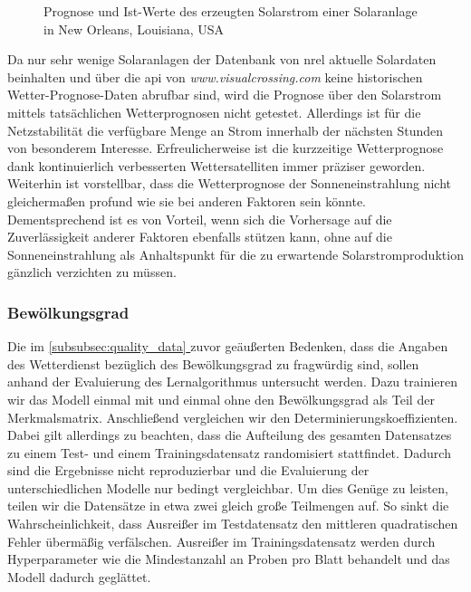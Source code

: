\documentclass[12pt, a4paper]{article}
\newcommand*{\fullref}[1]{\hyperref[{#1}]{\autoref*{#1} \nameref*{#1}}}
\begin{document}
\begin{figure}
\centering
\def\svgwidth{400pt}

\caption{Prognose und Ist-Werte des erzeugten Solarstrom einer Solaranlage in New Orleans, Louisiana, USA}
\label{fig:predictions_1244}
\end {figure}

Da nur sehr wenige Solaranlagen der Datenbank von \ac{nrel} aktuelle Solardaten beinhalten und über die \ac{api} von \textit{www.visualcrossing.com} keine historischen Wetter-Prognose-Daten abrufbar sind, wird die Prognose über den Solarstrom mittels tatsächlichen Wetterprognosen nicht getestet. Allerdings ist für die Netzstabilität die verfügbare Menge an Strom innerhalb der nächsten Stunden von besonderem Interesse. Erfreulicherweise ist die kurzzeitige Wetterprognose dank kontinuierlich verbesserten Wettersatelliten immer präziser geworden. Weiterhin ist vorstellbar, dass die Wetterprognose der Sonneneinstrahlung nicht gleichermaßen profund wie sie bei anderen Faktoren sein könnte. Dementsprechend ist es von Vorteil, wenn sich die Vorhersage auf die Zuverlässigkeit anderer Faktoren ebenfalls stützen kann, ohne auf die Sonneneinstrahlung als Anhaltspunkt für die zu erwartende Solarstromproduktion gänzlich verzichten zu müssen.


\subsubsection{Bewölkungsgrad}

Die im \fullref{subsubsec:quality_data} zuvor geäußerten Bedenken, dass die Angaben des Wetterdienst bezüglich des Bewölkungsgrad zu fragwürdig sind, sollen anhand der Evaluierung des Lernalgorithmus untersucht werden. Dazu trainieren wir das Modell einmal mit und einmal ohne den Bewölkungsgrad als Teil der Merkmalsmatrix. Anschließend vergleichen wir den Determinierungskoeffizienten. Dabei gilt allerdings zu beachten, dass die Aufteilung des gesamten Datensatzes zu einem Test- und einem Trainingsdatensatz randomisiert stattfindet. Dadurch sind die Ergebnisse nicht reproduzierbar und die Evaluierung der unterschiedlichen Modelle nur bedingt vergleichbar. Um dies Genüge zu leisten, teilen wir die Datensätze in etwa zwei gleich große Teilmengen auf. So sinkt die Wahrscheinlichkeit, dass Ausreißer im Testdatensatz den mittleren quadratischen Fehler übermäßig verfälschen. Ausreißer im Trainingsdatensatz werden durch Hyperparameter wie die Mindestanzahl an Proben pro Blatt behandelt und das Modell dadurch geglättet. 
\end{document}
